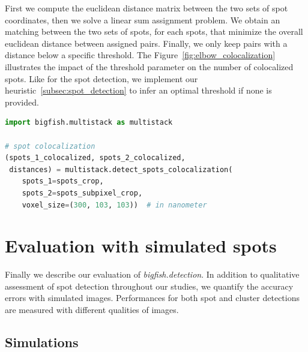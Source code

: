 First we compute the euclidean distance matrix between the two sets of spot coordinates, then we solve a linear sum assignment problem\cite{crouse_linear_assignment_2016, 2020SciPy-NMeth}.
We obtain an matching between the two sets of spots, for each spots, that minimize the overall euclidean distance between assigned pairs.
Finally, we only keep pairs with a distance below a specific threshold.
The Figure~\ref{fig:elbow_colocalization} illustrates the impact of the threshold parameter on the number of colocalized spots.
Like for the spot detection, we implement our heuristic~\ref{subsec:spot_detection} to infer an optimal threshold if none is provided.\\

\begin{minipage}{0.9\textwidth}
\begin{lstlisting}[language=Python]
import bigfish.multistack as multistack

# spot colocalization
(spots_1_colocalized, spots_2_colocalized,
 distances) = multistack.detect_spots_colocalization(
	spots_1=spots_crop,
	spots_2=spots_subpixel_crop,
	voxel_size=(300, 103, 103))  # in nanometer
\end{lstlisting}
\end{minipage}


\section{Evaluation with simulated spots}
\label{sec:detection_evaluation}

Finally we describe our evaluation of \emph{bigfish.detection}.
In addition to qualitative assessment of spot detection throughout our studies, we quantify the accuracy errors with simulated images.
Performances for both spot and cluster detections are measured with different qualities of images.

\subsection{Simulations}
\label{subsec:simulation}


